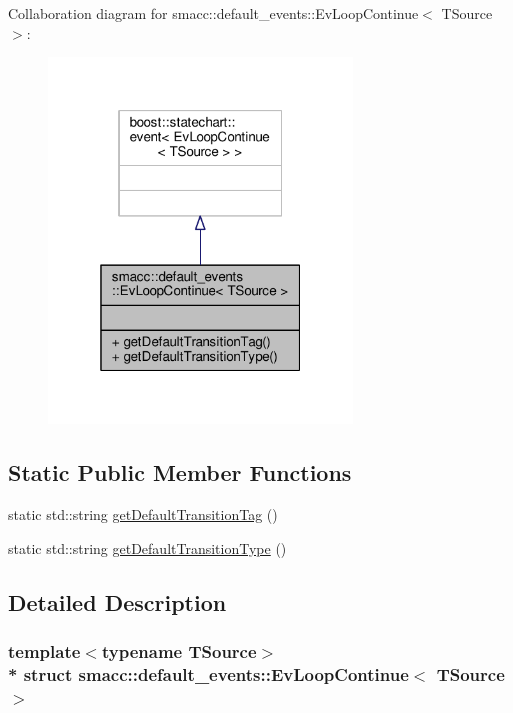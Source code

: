 Collaboration diagram for smacc\+:\+:default\+\_\+events\+:\+:Ev\+Loop\+Continue$<$ T\+Source $>$\+:\nopagebreak
\begin{figure}[H]
\begin{center}
\leavevmode
\includegraphics[width=229pt]{structsmacc_1_1default__events_1_1EvLoopContinue__coll__graph}
\end{center}
\end{figure}
\subsection*{Static Public Member Functions}
\begin{DoxyCompactItemize}
\item 
static std\+::string \hyperlink{structsmacc_1_1default__events_1_1EvLoopContinue_ae00f172d20325e8ce0a91bf3d7945992}{get\+Default\+Transition\+Tag} ()
\item 
static std\+::string \hyperlink{structsmacc_1_1default__events_1_1EvLoopContinue_a16ed3e9e57f615cd748c8a65956ca48c}{get\+Default\+Transition\+Type} ()
\end{DoxyCompactItemize}


\subsection{Detailed Description}
\subsubsection*{template$<$typename T\+Source$>$\\*
struct smacc\+::default\+\_\+events\+::\+Ev\+Loop\+Continue$<$ T\+Source $>$}



